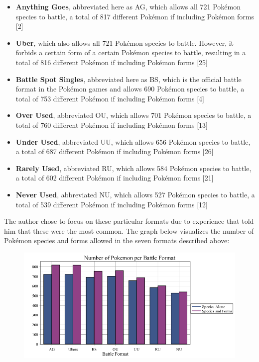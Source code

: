 \documentclass{article}
\begin{document}
\begin{itemize}
	\item \textbf{Anything Goes}, abbreviated here as AG, which allows all 721 Pok\'emon species to battle, a total of 817 different Pok\'emon if including Pok\'emon forms [2]
	\item \textbf{Uber}, which also allows all 721 Pok\'emon species to battle. However, it forbids a certain form of a certain Pok\'emon species to battle, resulting in a total of 816 different Pok\'emon if including Pok\'emon forms [25]
	\item \textbf{Battle Spot Singles}, abbreviated here as BS, which is the official battle format in the Pok\'emon games and allows 690 Pok\'emon species to battle, a total of 753 different Pok\'emon if including Pok\'emon forms [4]
	\item \textbf{Over Used}, abbreviated OU, which allows 701 Pok\'emon species to battle, a total of 760 different Pok\'emon if including Pok\'emon forms [13]
	\item \textbf{Under Used}, abbreviated UU, which allows 656 Pok\'emon species to battle, a total of 687 different Pok\'emon if including Pok\'emon forms [26]
	\item \textbf{Rarely Used}, abbreviated RU, which allows 584 Pok\'emon species to battle, a total of 602 different Pok\'emon if including Pok\'emon forms [21]
	\item \textbf{Never Used}, abbreviated NU, which allows 527 Pok\'emon species to battle, a total of 539 different Pok\'emon if including Pok\'emon forms [12]
\end{itemize}
The author chose to focus on these particular formats due to experience that told him that these were the most common.
The graph below visualizes the number of Pok\'emon species and forms allowed in the seven formats described above:
\begin{figure}[H]
	\includegraphics[width=\textwidth]{TierAmount.png}
	\centering
	\caption{}\label{TierAmountGraph}
\end{figure}
\end{document}
